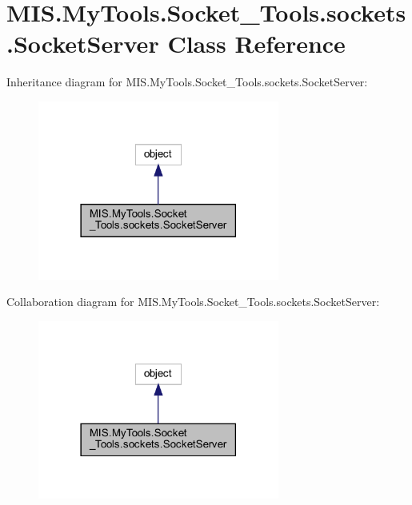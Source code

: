 \hypertarget{classMIS_1_1MyTools_1_1Socket__Tools_1_1sockets_1_1SocketServer}{}\section{M\+I\+S.\+My\+Tools.\+Socket\+\_\+\+Tools.\+sockets.\+Socket\+Server Class Reference}
\label{classMIS_1_1MyTools_1_1Socket__Tools_1_1sockets_1_1SocketServer}


Inheritance diagram for M\+I\+S.\+My\+Tools.\+Socket\+\_\+\+Tools.\+sockets.\+Socket\+Server\+:\nopagebreak
\begin{figure}[H]
\begin{center}
\leavevmode
\includegraphics[width=225pt]{classMIS_1_1MyTools_1_1Socket__Tools_1_1sockets_1_1SocketServer__inherit__graph}
\end{center}
\end{figure}


Collaboration diagram for M\+I\+S.\+My\+Tools.\+Socket\+\_\+\+Tools.\+sockets.\+Socket\+Server\+:\nopagebreak
\begin{figure}[H]
\begin{center}
\leavevmode
\includegraphics[width=225pt]{classMIS_1_1MyTools_1_1Socket__Tools_1_1sockets_1_1SocketServer__coll__graph}
\end{center}
\end{figure}
